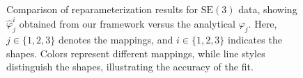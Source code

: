 \begin{figure}[!ht]
    \caption[Reparameterization of Curves in \(\mathrm{SE}(3)\)]{Comparison of reparameterization results for \(\mathrm{SE}(3)\) data, showing \(\hat{\varphi}_j^{i}\) obtained from our framework versus the analytical \(\varphi_j\). Here, \(j \in \{1, 2, 3\}\) denotes the mappings, and \(i \in \{1, 2, 3\}\) indicates the shapes. Colors represent different mappings, while line styles distinguish the shapes, illustrating the accuracy of the fit.}
    \label{fig:reparameterization-SE3-SLERP}
\end{figure}

